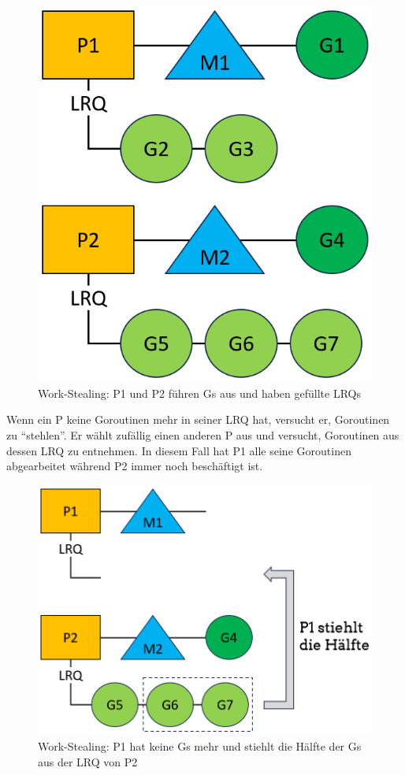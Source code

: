 \documentclass[fontsize=12pt,paper=a4,twoside=semi,parskip=half-,headsepline,headinclude]{scrreprt}
\begin{document}
\begin{figure}[H]
	\centering
	\includegraphics[scale=0.5]{figures/GoroutineWorkstealing1.png}
	\caption{Work-Stealing: P1 und P2 führen Gs aus und haben gefüllte LRQs}
	\label{fig:GoroutineWorkstealing1}
\end{figure}

Wenn ein P keine Goroutinen mehr in seiner LRQ hat, versucht er, Goroutinen zu ``stehlen''. Er wählt zufällig einen anderen P aus und versucht, Goroutinen aus dessen LRQ zu entnehmen. In diesem Fall hat P1 alle seine Goroutinen abgearbeitet während P2 immer noch beschäftigt ist.

\begin{figure}[h]
	\centering
	\includegraphics[scale=0.5]{figures/GoroutineWorkstealing2.png}
	\caption{Work-Stealing: P1 hat keine Gs mehr und stiehlt die Hälfte der Gs aus der LRQ von P2}
	\label{fig:GoroutineWorkstealing2}
\end{figure}
\end{document}
